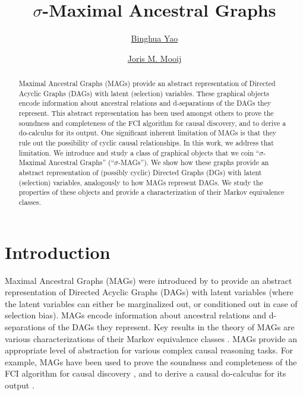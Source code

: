 \documentclass[accepted]{uai2025} %
\title{$\sigma$-Maximal Ancestral Graphs}
\author[1]{\href{mailto:<binghuayao71210@gmail.com>}{Binghua Yao}{}}
\author[1]{\href{mailto:<J.M.Mooij@uva.nl>}{Joris M. Mooij}{}}
\affil[1]{%
    Korteweg-de Vries Institute\\
    University of Amsterdam\\
    Amsterdam, The Netherlands
}
\begin{document}
\maketitle

\begin{abstract}%
Maximal Ancestral Graphs (MAGs) provide an abstract representation of Directed Acyclic Graphs (DAGs) with latent (selection) variables. These graphical objects encode information about ancestral relations and d-separations of the DAGs they represent. This abstract representation has been used amongst others to prove the soundness and completeness of the FCI algorithm for causal discovery, and to derive a do-calculus for its output. One significant inherent limitation of MAGs is that they rule out the possibility of cyclic causal relationships. In this work, we address that limitation. We introduce and study a class of graphical objects that we coin ``$\sigma$-Maximal Ancestral Graphs'' (``$\sigma$-MAGs''). We show how these graphs provide an abstract representation of (possibly cyclic) Directed Graphs (DGs) with latent (selection) variables, analogously to how MAGs represent DAGs. We study the properties of these objects and provide a characterization of their Markov equivalence classes.
\end{abstract}

\section{Introduction}\label{sec:intro}
Maximal Ancestral Graphs (MAGs) were introduced by \citet{richardson2002ancestral} to provide an abstract representation of Directed Acyclic Graphs (DAGs) with latent variables (where the latent variables can either be marginalized out, or conditioned out in case of selection bias). MAGs encode information about ancestral relations and d-separations of the DAGs they represent. Key results in the theory of MAGs are various characterizations of their Markov equivalence classes \citep{spirtes1996polynomial,Ali++2005,ZhaoZhengLiu2005,AliRichardsonSpirtes2009}. MAGs provide an appropriate level of abstraction for various complex causal reasoning tasks. For example, MAGs have been used to prove the soundness and completeness of the FCI algorithm for causal discovery \citep{SMR1995,Ali++2005,Zhang2008_JMLR}, and to derive a causal do-calculus for its output \citep{Zhang2008_AI}.
\end{document}
